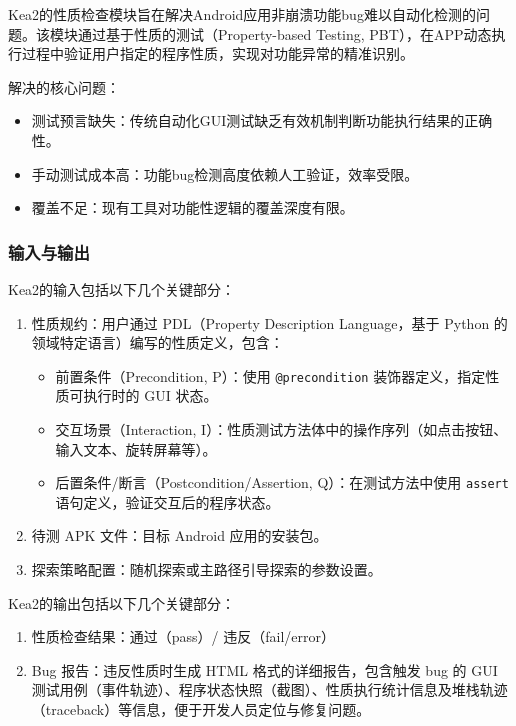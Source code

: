 \documentclass[a4paper, zihao=-4]{ctexart}
\newcommand{\bff}[1]{{\heiti #1}}
\begin{document}
Kea2的性质检查模块旨在解决Android应用非崩溃功能bug难以自动化检测的问题。该模块通过\bff{基于性质的测试（Property-based Testing, PBT）}，在APP动态执行过程中验证用户指定的程序性质，实现对功能异常的精准识别。

\bff{解决的核心问题}：
\begin{itemize}
    \item \bff{测试预言缺失}：传统自动化GUI测试缺乏有效机制判断功能执行结果的正确性。
    \item \bff{手动测试成本高}：功能bug检测高度依赖人工验证，效率受限。
    \item \bff{覆盖不足}：现有工具对功能性逻辑的覆盖深度有限。
\end{itemize}

\subsubsection{输入与输出}

Kea2的\bff{输入}包括以下几个关键部分：
\begin{enumerate}
    \item \bff{性质规约}：用户通过 \bff{PDL}（Property Description Language，基于 Python 的领域特定语言）编写的性质定义，包含：
    \begin{itemize}
        \item \bff{前置条件（Precondition, P）}：使用 \texttt{@precondition} 装饰器定义，指定性质可执行时的 \bff{GUI} 状态。
        \item \bff{交互场景（Interaction, I）}：性质测试方法体中的操作序列（如点击按钮、输入文本、旋转屏幕等）。
        \item \bff{后置条件/断言（Postcondition/Assertion, Q）}：在测试方法中使用 \texttt{assert} 语句定义，验证交互后的程序状态。
    \end{itemize}
    
    \item \bff{待测 APK 文件}：目标 \bff{Android} 应用的安装包。
    
    \item \bff{探索策略配置}：随机探索或主路径引导探索的参数设置。
\end{enumerate}

Kea2的\bff{输出}包括以下几个关键部分：
\begin{enumerate}
    \item \bff{性质检查结果}：通过（pass）/ 违反（fail/error）
    \item \bff{Bug 报告}：违反性质时生成 \bff{HTML} 格式的详细报告，包含触发 bug 的 GUI 测试用例（事件轨迹）、程序状态快照（截图）、性质执行统计信息及堆栈轨迹（traceback）等信息，便于开发人员定位与修复问题。
\end{enumerate}
\end{document}
